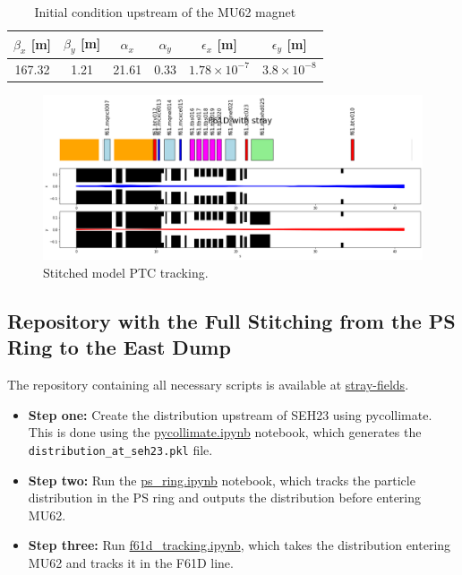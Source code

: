 \begin{table}[htbp]
\centering
\caption{Initial condition upstream of the MU62 magnet}
\label{tab:twiss_parameters}
\begin{tabular}{|c|c|c|c|c|c|}
\hline
$\beta_{x}$ [m] & $\beta_{y}$ [m] & $\alpha_{x}$ & $\alpha_{y}$ & $\epsilon_x$ [m] & $\epsilon_y$ [m] \\
\hline
167.32 & 1.21 & 21.61 & 0.33 & $1.78 \times 10^{-7}$ & $3.8 \times 10^{-8}$ \\
\hline
\end{tabular}
\end{table}

\begin{figure}[H]
\centering
\includegraphics[width=1.0\textwidth]{02_Simulation/images/PTC_stray_field.png}
\caption{Stitched model PTC tracking.}
\label{fig:stitched_PTC}
\end{figure}

\subsection{Repository with the Full Stitching from the PS Ring to the East Dump}
\label{Stich in three steps}

The repository containing all necessary scripts is available at \href{https://gitlab.cern.ch/eljohnso/stray-fields}{stray-fields}.

\begin{itemize}
    \item \textbf{Step one:} Create the distribution upstream of SEH23 using pycollimate. This is done using the \href{https://gitlab.cern.ch/eljohnso/stray-fields/-/blob/master/pycollimate.ipynb}{pycollimate.ipynb} notebook, which generates the \texttt{distribution\_at\_seh23.pkl} file.
    \item \textbf{Step two:} Run the \href{https://gitlab.cern.ch/eljohnso/stray-fields/-/blob/master/ps_ring.ipynb?ref_type=heads}{ps\_ring.ipynb} notebook, which tracks the particle distribution in the PS ring and outputs the distribution before entering MU62.
    \item \textbf{Step three:} Run \href{https://gitlab.cern.ch/eljohnso/stray-fields/-/blob/master/f61d_tracking.ipynb?ref_type=heads}{f61d\_tracking.ipynb}, which takes the distribution entering MU62 and tracks it in the F61D line.
\end{itemize}

